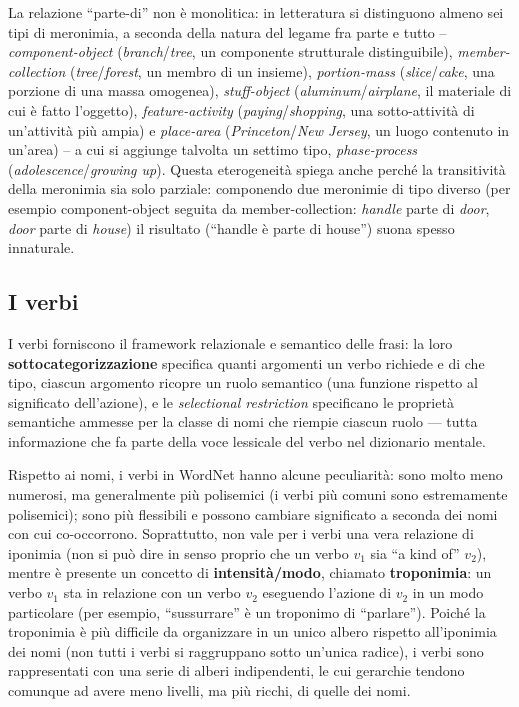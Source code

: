 \documentclass[11pt,a4paper]{report}
\begin{document}
La relazione ``parte-di'' non è monolitica: in letteratura si distinguono almeno sei tipi di meronimia, a seconda della natura del legame fra parte e tutto -- \emph{component-object} (\textit{branch}/\textit{tree}, un componente strutturale distinguibile), \emph{member-collection} (\textit{tree}/\textit{forest}, un membro di un insieme), \emph{portion-mass} (\textit{slice}/\textit{cake}, una porzione di una massa omogenea), \emph{stuff-object} (\textit{aluminum}/\textit{airplane}, il materiale di cui è fatto l'oggetto), \emph{feature-activity} (\textit{paying}/\textit{shopping}, una sotto-attività di un'attività più ampia) e \emph{place-area} (\textit{Princeton}/\textit{New Jersey}, un luogo contenuto in un'area) -- a cui si aggiunge talvolta un settimo tipo, \emph{phase-process} (\textit{adolescence}/\textit{growing up}). Questa eterogeneità spiega anche perché la transitività della meronimia sia solo parziale: componendo due meronimie di tipo diverso (per esempio component-object seguita da member-collection: \textit{handle} parte di \textit{door}, \textit{door} parte di \textit{house}) il risultato (``handle è parte di house'') suona spesso innaturale.

\subsection{I verbi}

I verbi forniscono il framework relazionale e semantico delle frasi: la loro \textbf{sottocategorizzazione} specifica quanti argomenti un verbo richiede e di che tipo, ciascun argomento ricopre un ruolo semantico (una funzione rispetto al significato dell'azione), e le \emph{selectional restriction} specificano le proprietà semantiche ammesse per la classe di nomi che riempie ciascun ruolo --- tutta informazione che fa parte della voce lessicale del verbo nel dizionario mentale.

Rispetto ai nomi, i verbi in WordNet hanno alcune peculiarità: sono molto meno numerosi, ma generalmente più polisemici (i verbi più comuni sono estremamente polisemici); sono più flessibili e possono cambiare significato a seconda dei nomi con cui co-occorrono. Soprattutto, non vale per i verbi una vera relazione di iponimia (non si può dire in senso proprio che un verbo $v_1$ sia ``a kind of'' $v_2$), mentre è presente un concetto di \textbf{intensità/modo}, chiamato \textbf{troponimia}: un verbo $v_1$ sta in relazione con un verbo $v_2$ eseguendo l'azione di $v_2$ in un modo particolare (per esempio, ``sussurrare'' è un troponimo di ``parlare''). Poiché la troponimia è più difficile da organizzare in un unico albero rispetto all'iponimia dei nomi (non tutti i verbi si raggruppano sotto un'unica radice), i verbi sono rappresentati con una serie di alberi indipendenti, le cui gerarchie tendono comunque ad avere meno livelli, ma più ricchi, di quelle dei nomi.
\end{document}
